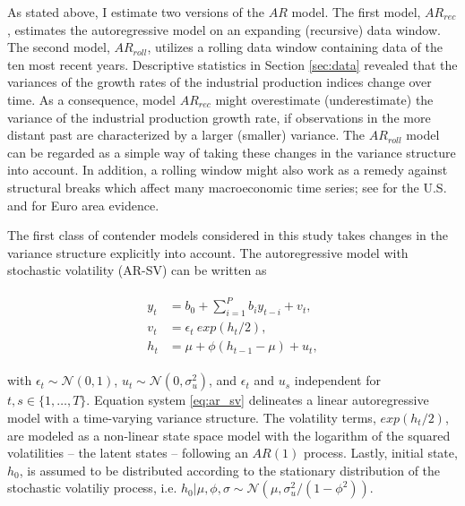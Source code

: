 \documentclass[12pt,letterpaper,fleqn]{article}           %
\begin{document}
As stated above, I estimate two versions of the $AR$ model. The first model, $AR_{rec}$, estimates the autoregressive model on an expanding (recursive) data window. The second model, $AR_{roll}$, utilizes a rolling data window containing data of the ten most recent years. Descriptive statistics in Section \ref{sec:data} revealed that the variances of the growth rates of the industrial production indices change over time. As a consequence, model $AR_{rec}$ might overestimate (underestimate) the variance of the industrial production growth rate, if observations in the more distant past are characterized by a larger (smaller) variance. The $AR_{roll}$ model can be regarded as a simple way of taking these changes in the variance structure into account. In addition, a rolling window might also work as a remedy against structural breaks which affect many macroeconomic time series; see \textcite{stock96} for the U.S. and \textcite{marc02} for Euro area evidence.


The first class of contender models considered in this study takes changes in the variance structure explicitly into account. The autoregressive model with stochastic volatility (AR-SV) can be written as

\begin{align}
\begin{split}
y_t &= b_0 + \sum_{i=1}^P b_i y_{t-i} + v_t, \\
v_t &= \epsilon_t\ exp(h_t / 2), \\
h_t &= \mu + \phi(h_{t-1} - \mu) + u_t,
\label{eq:ar_sv}
\end{split}
\end{align}

with $\epsilon_t \sim \mathcal{N}(0, 1)$, $u_t \sim \mathcal{N}(0, \sigma_u^2)$, and $\epsilon_t$ and $u_s$ independent for $t,s \in \{1,\ldots,T\}$. Equation system \eqref{eq:ar_sv} delineates a linear autoregressive model with a time-varying variance structure. The volatility terms, $exp(h_t / 2)$, are modeled as a non-linear state space model with the logarithm of the squared volatilities -- the latent states -- following  an $AR(1)$ process. Lastly, initial state, $h_0$, is assumed to be distributed according to the stationary distribution of the stochastic volatiliy process, i.e. $h_0|\mu, \phi, \sigma \sim \mathcal{N}(\mu, \sigma_u^2 / (1 - \phi^2))$.
\end{document}
